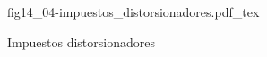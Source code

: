 \begin{figure}[h]
\centering
\def\svgwidth{0.5\textwidth}
{fig14_04-impuestos_distorsionadores.pdf_tex}
\caption{Impuestos distorsionadores}
\label{fig14_04-impuestos_distorsionadores}
\end{figure}